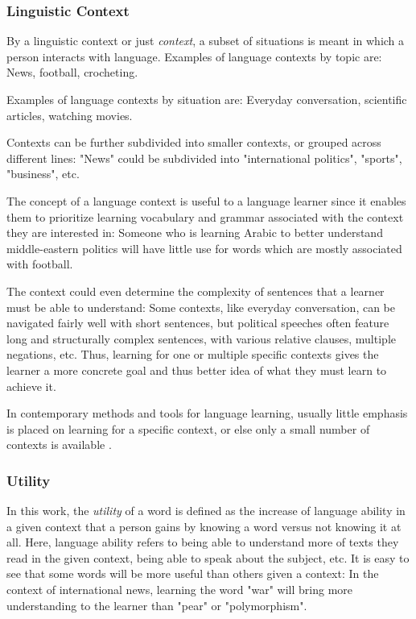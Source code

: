 \subsubsection{Linguistic Context}
By a linguistic context or just \textit{context}, a subset of situations is meant in which a person interacts with language.
Examples of language contexts by topic are:
News, football, crocheting.

Examples of language contexts by situation are:
Everyday conversation, scientific articles, watching movies.

Contexts can be further subdivided into smaller contexts, or grouped across different lines:
"News" could be subdivided into "international politics", "sports", "business", etc.

The concept of a language context is useful to a language learner since it enables them to prioritize learning vocabulary and grammar associated with the context they are interested in:
Someone who is learning Arabic to better understand middle-eastern politics will have little use for words which are mostly associated with football.

The context could even determine the complexity of sentences that a learner must be able to understand:
Some contexts, like everyday conversation, can be navigated fairly well with short sentences, but political speeches often feature long and structurally complex sentences, with various relative clauses, multiple negations, etc. 
Thus, learning for one or multiple specific contexts gives the learner a more concrete goal and thus better idea of what they must learn to achieve it.

In contemporary methods and tools for language learning, usually little emphasis is placed on learning for a specific context, or else only a small number of contexts is available .

\subsubsection{Utility}
In this work, the \textit{utility} of a word is defined as the increase of language ability in a given context that a person gains by knowing a word versus not knowing it at all.
Here, language ability refers to being able to understand more of texts they read in the given context, being able to speak about the subject, etc.
It is easy to see that some words will be more useful than others given a context:
In the context of international news, learning the word "war" will bring more understanding to the learner than "pear" or "polymorphism".

